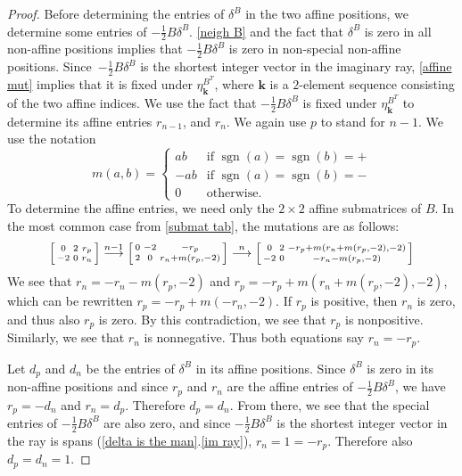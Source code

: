 \documentclass{amsart}
\theoremstyle{definition}
\theoremstyle{remark}
\numberwithin{equation}{section}
\newcommand{\sgn}{\operatorname{sgn}}
\newcommand{\0}{{\mathbf{0}}}
\newcommand{\kk}{\mathbf{k}}
\begin{document}
\begin{proof}
Before determining the entries of $\delta^B$ in the two affine positions, we determine some entries of $-\frac12B\delta^B$.
\cref{neigh B} and the fact that $\delta^B$ is zero in all non-affine positions implies that $-\frac12B\delta^B$ is zero in non-special non-affine positions.
Since~$-\frac12B\delta^B$ is the shortest integer vector in the imaginary ray, \cref{affine mut} implies that it is fixed under $\eta^{B^T}_\kk$, where $\kk$ is a $2$-element sequence consisting of the two affine indices. 
We use the fact that $-\frac12B\delta^B$ is fixed under $\eta^{B^T}_\kk$ to determine its affine entries $r_{n-1}$, and $r_n$.
We again use $p$ to stand for $n-1$.
We use the notation 
\[m(a,b)=\begin{cases}
ab&\text{if }\sgn(a)=\sgn(b)=+\\
-ab&\text{if }\sgn(a)=\sgn(b)=-\\
0&\text{otherwise}.
\end{cases}\]
To determine the affine entries, we need only the $2\times2$ affine submatrices of $B$.
In the most common case from \cref{submat tab}, the mutations are as follows:
\[
\begin{bsmallmatrix*}
0 & 2 & r_p\\
-2 & 0 & r_n
\end{bsmallmatrix*}\overset{n-1}{\longrightarrow}
\begin{bsmallmatrix*}
0 & -2 & -r_p\\
2 & 0 & r_n+m(r_p,-2)
\end{bsmallmatrix*}\overset{n}{\longrightarrow}
\begin{bsmallmatrix*}
0 & 2 & -r_p+m(r_n+m(r_p,-2),-2)\\
-2 & 0 & -r_n-m(r_p,-2)
\end{bsmallmatrix*}
\]
We see that $r_n=-r_n-m(r_p,-2)$ and $r_p=-r_p+m(r_n+m(r_p,-2),-2)$, which can be rewritten $r_p=-r_p+m(-r_n,-2)$.
If $r_p$ is positive, then $r_n$ is zero, and thus also $r_p$ is zero.
By this contradiction, we see that $r_p$ is nonpositive.
Similarly, we see that $r_n$ is nonnegative.
Thus both equations say $r_n=-r_p$.

Let $d_p$ and $d_n$ be the entries of $\delta^B$ in its affine positions.
Since $\delta^B$ is zero in its non-affine positions and since $r_p$ and $r_n$ are the affine entries of $-\frac12B\delta^B$, we have $r_p=-d_n$ and $r_n=d_p$.
Therefore $d_p=d_n$.
From there, we see that the special entries of $-\frac12B\delta^B$ are also zero, and since $-\frac12B\delta^B$ is the shortest integer vector in the ray is spans (\cref{delta is the man}.\ref{im ray}), $r_n=1=-r_p$.
Therefore also $d_p=d_n=1$.


\end{proof}
\end{document}
